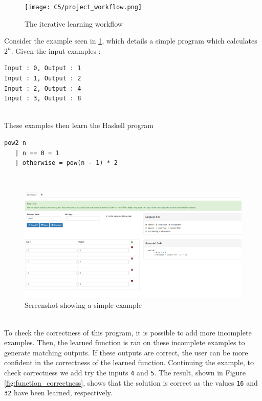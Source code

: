 \begin{figure}[h!]
\centering
\texttt{[image: C5/project\_workflow.png]}
\caption{The iterative learning workflow}
\end{figure}
Consider the example seen in \ref{fig:screenshot}, which details a simple program which calculates $2^n$. Given the input examples :\\
\begin{lstlisting}
Input : 0, Output : 1
Input : 1, Output : 2
Input : 2, Output : 4
Input : 3, Output : 8
\end{lstlisting}
\mbox{}\\
These examples then learn the Haskell program \\
\begin{lstlisting}
pow2 n
   | n == 0 = 1
   | otherwise = pow(n - 1) * 2
\end{lstlisting}
\mbox{}\\

\begin{figure}[h!]
\centering
\includegraphics[width=\textwidth]{C1/screenshot_pow2.png}
\caption{Screenshot showing a simple example}
\label{fig:screenshot}
\end{figure}
\mbox{}\\
To check the correctness of this program, it is possible to add more incomplete examples. Then, the learned function is ran on these incomplete examples to generate matching outputs. If these outputs are correct, the user can be more confident in the correctness of the learned function. Continuing the example, to check correctness we add try the inputs \lstinline!4! and \lstinline!5!. The result, shown in Figure \ref{fig:function_correctness}, shows that the solution is correct as the values \lstinline!16! and \lstinline!32! have been learned, respectively.

